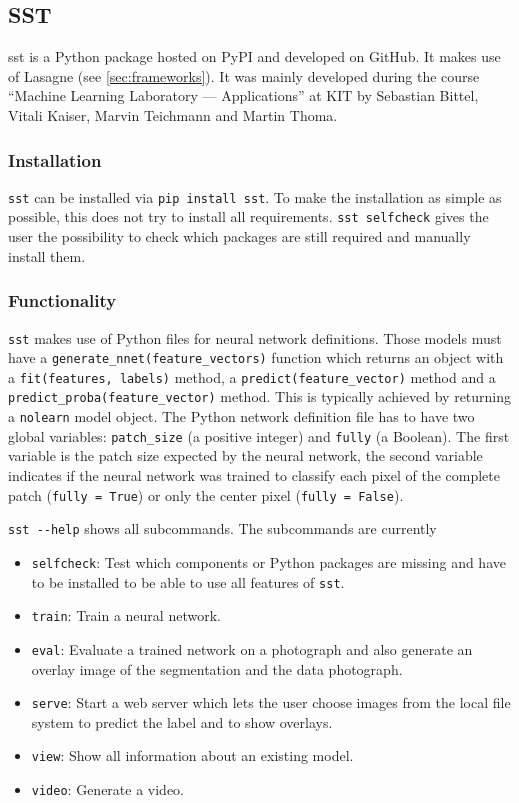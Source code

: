 
\subsection{SST}\label{sec:sst}
\Gls{sst} is a Python package hosted on \gls{PyPI} and developed on GitHub.
It makes use of Lasagne (see \cref{sec:frameworks}). It was mainly developed
during the course \enquote{Machine Learning Laboratory --- Applications} at
KIT by Sebastian Bittel, Vitali Kaiser, Marvin Teichmann and Martin Thoma.

\subsubsection{Installation}
\verb+sst+ can be installed via \verb+pip install sst+. To make the
installation as simple as possible, this does not try to install all
requirements.
\verb+sst selfcheck+ gives the user the possibility to check which packages
are still required and manually install them.

\subsubsection{Functionality}
\verb+sst+ makes use of Python files for neural network definitions. Those
models must have a \verb+generate_nnet(feature_vectors)+ function which
returns an object with a \verb+fit(features, labels)+ method, a
\verb+predict(feature_vector)+ method and a
\verb+predict_proba(feature_vector)+ method. This is typically achieved by
returning a \verb+nolearn+ model object. The Python network definition file
has to have two global variables: \verb+patch_size+ (a positive integer) and
\verb+fully+ (a Boolean). The first variable is the patch size expected by the
neural network, the second variable indicates if the neural network was trained
to classify each pixel of the complete patch (\verb+fully = True+) or only the
center pixel (\verb+fully = False+).

\verb+sst --help+ shows all subcommands. The subcommands are currently

\begin{itemize}
    \item \verb+selfcheck+: Test which components or Python packages are
                            missing and have to be installed to be able to use
                            all features of \verb+sst+.
    \item \verb+train+: Train a neural network.
    \item \verb+eval+: Evaluate a trained network on a photograph and also
                       generate an overlay image of the segmentation and the
                       data photograph.
    \item \verb+serve+: Start a web server which lets the user choose images
                        from the local file system to predict the label and to
                        show overlays.
    \item \verb+view+: Show all information about an existing model.
    \item \verb+video+: Generate a video.
\end{itemize}
